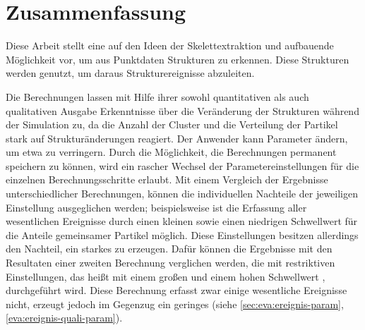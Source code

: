 

\chapter{Zusammenfassung}

Diese Arbeit stellt eine auf den Ideen der Skelettextraktion und  aufbauende Möglichkeit vor, um aus Punktdaten Strukturen zu erkennen. Diese Strukturen werden genutzt, um daraus Strukturereignisse abzuleiten.

Die Berechnungen lassen mit Hilfe ihrer sowohl quantitativen als auch qualitativen Ausgabe Erkenntnisse über die Veränderung der Strukturen während der Simulation zu, da die Anzahl der Cluster und die Verteilung der Partikel stark auf Strukturänderungen reagiert. Der Anwender kann Parameter ändern, um etwa  zu verringern. Durch die Möglichkeit, die Berechnungen permanent speichern zu können, wird ein rascher Wechsel der Parametereinstellungen für die einzelnen Berechnungsschritte erlaubt. Mit einem Vergleich der Ergebnisse unterschiedlicher Berechnungen, können die individuellen Nachteile der jeweiligen Einstellung ausgeglichen werden; beispielsweise ist die Erfassung aller wesentlichen Ereignisse durch einen kleinen   sowie einen niedrigen Schwellwert für die Anteile gemeinsamer Partikel  möglich. Diese Einstellungen besitzen allerdings den Nachteil, ein starkes  zu erzeugen. Dafür können die Ergebnisse mit den Resultaten einer zweiten Berechnung verglichen werden, die mit restriktiven Einstellungen, das heißt mit einem großen  und einem hohen Schwellwert , durchgeführt wird. Diese Berechnung erfasst zwar einige wesentliche Ereignisse nicht, erzeugt jedoch im Gegenzug ein geringes  (siehe \autoref{sec:eva:ereignis-param}, \autoref{eva:ereignis-quali-param}).

